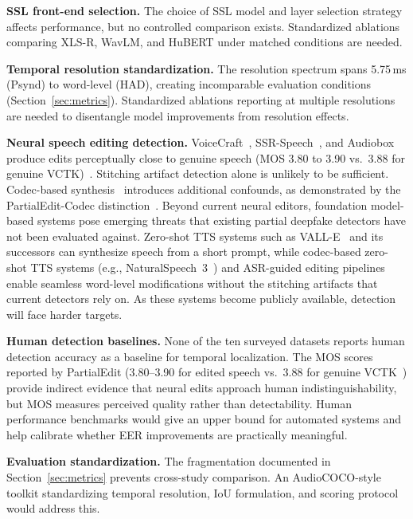 \documentclass[journal]{IEEEtran}
\begin{document}
\textbf{SSL front-end selection.} The choice of SSL model and layer selection strategy affects performance, but no controlled comparison exists. Standardized ablations comparing XLS-R, WavLM, and HuBERT under matched conditions are needed.

\textbf{Temporal resolution standardization.} The resolution spectrum spans 5.75\,ms (Psynd) to word-level (HAD), creating incomparable evaluation conditions (Section~\ref{sec:metrics}). Standardized ablations reporting at multiple resolutions are needed to disentangle model improvements from resolution effects.

\textbf{Neural speech editing detection.} VoiceCraft~\cite{peng2024voicecraft}, SSR-Speech~\cite{wang2025ssrspeech}, and Audiobox~\cite{vyas2023audiobox} produce edits perceptually close to genuine speech (MOS 3.80 to 3.90 vs.\ 3.88 for genuine VCTK)~\cite{zhang2025partialedit,kassmann2024speechediting}. Stitching artifact detection alone is unlikely to be sufficient. Codec-based synthesis~\cite{defossez2023encodec,zeghidour2022soundstream,codecfake2024,xie2025codecfake_dataset} introduces additional confounds, as demonstrated by the PartialEdit-Codec distinction~\cite{zhang2025partialedit}. Beyond current neural editors, foundation model-based systems pose emerging threats that existing partial deepfake detectors have not been evaluated against. Zero-shot TTS systems such as VALL-E~\cite{wang2023valle} and its successors can synthesize speech from a short prompt, while codec-based zero-shot TTS systems (e.g., NaturalSpeech~3~\cite{ju2024naturalspeech3}) and ASR-guided editing pipelines enable seamless word-level modifications without the stitching artifacts that current detectors rely on. As these systems become publicly available, detection will face harder targets.

\textbf{Human detection baselines.} None of the ten surveyed datasets reports human detection accuracy as a baseline for temporal localization. The MOS scores reported by PartialEdit (3.80--3.90 for edited speech vs.\ 3.88 for genuine VCTK~\cite{zhang2025partialedit}) provide indirect evidence that neural edits approach human indistinguishability, but MOS measures perceived quality rather than detectability. Human performance benchmarks would give an upper bound for automated systems and help calibrate whether EER improvements are practically meaningful.

\textbf{Evaluation standardization.} The fragmentation documented in Section~\ref{sec:metrics} prevents cross-study comparison. An AudioCOCO-style toolkit standardizing temporal resolution, IoU formulation, and scoring protocol would address this.
\end{document}
